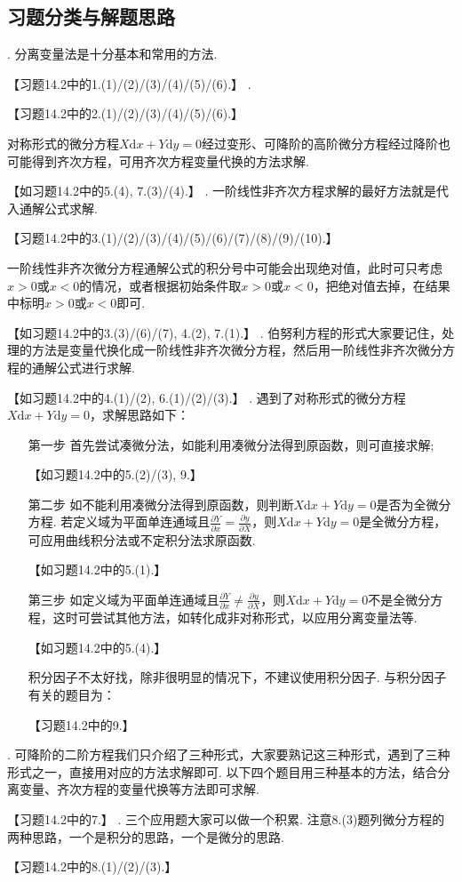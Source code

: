 \documentclass[12pt,UTF8,fleqn]{ctexart}
\newcommand{\md}[1]{\mathrm d#1}
\newcommand{\pp}[2]{\frac{\partial #1}{\partial #2}}
\newcommand{\ppx}[1]{\frac{\partial #1}{\partial x}}
\begin{document}
\subsection{习题分类与解题思路}
\begin{enumerate}
. 分离变量法是十分基本和常用的方法.

【习题14.2中的1.(1)/(2)/(3)/(4)/(5)/(6).】
.

【习题14.2中的2.(1)/(2)/(3)/(4)/(5)/(6).】

对称形式的微分方程$X\md x+Y\md y=0$经过变形、可降阶的高阶微分方程经过降阶也可能得到齐次方程，可用齐次方程变量代换的方法求解.

【如习题14.2中的5.(4), 7.(3)/(4).】
. 一阶线性非齐次方程求解的最好方法就是代入通解公式求解.

【习题14.2中的3.(1)/(2)/(3)/(4)/(5)/(6)/(7)/(8)/(9)/(10).】

一阶线性非齐次微分方程通解公式的积分号中可能会出现绝对值，此时可只考虑$x>0$或$x<0$的情况，或者根据初始条件取$x>0$或$x<0$，把绝对值去掉，在结果中标明$x>0$或$x<0$即可.

【如习题14.2中的3.(3)/(6)/(7), 4.(2), 7.(1).】
. 伯努利方程的形式大家要记住，处理的方法是变量代换化成一阶线性非齐次微分方程，然后用一阶线性非齐次微分方程的通解公式进行求解.

【如习题14.2中的4.(1)/(2), 6.(1)/(2)/(3).】
. 遇到了对称形式的微分方程$X\md x+Y\md y=0$，求解思路如下：
\begin{enumerate}
\item[第一步]首先尝试凑微分法，如能利用凑微分法得到原函数，则可直接求解;

【如习题14.2中的5.(2)/(3), 9.】
\item[第二步]如不能利用凑微分法得到原函数，则判断$X\md x+Y\md y=0$是否为全微分方程. 若定义域为平面单连通域且$\ppx Y=\pp yX$，则$X\md x+Y\md y=0$是全微分方程，可应用曲线积分法或不定积分法求原函数.

【如习题14.2中的5.(1).】
\item[第三步]如定义域为平面单连通域且$\ppx Y\neq\pp yX$，则$X\md x+Y\md y=0$不是全微分方程，这时可尝试其他方法，如转化成非对称形式，以应用分离变量法等.

【如习题14.2中的5.(4).】

积分因子不太好找，除非很明显的情况下，不建议使用积分因子. 与积分因子有关的题目为：

【习题14.2中的9.】
\end{enumerate}
. 可降阶的二阶方程我们只介绍了三种形式，大家要熟记这三种形式，遇到了三种形式之一，直接用对应的方法求解即可. 以下四个题目用三种基本的方法，结合分离变量、齐次方程的变量代换等方法即可求解.

【习题14.2中的7.】
. 三个应用题大家可以做一个积累. 注意8.(3)题列微分方程的两种思路，一个是积分的思路，一个是微分的思路.

【习题14.2中的8.(1)/(2)/(3).】
\end{enumerate}
\end{document}
